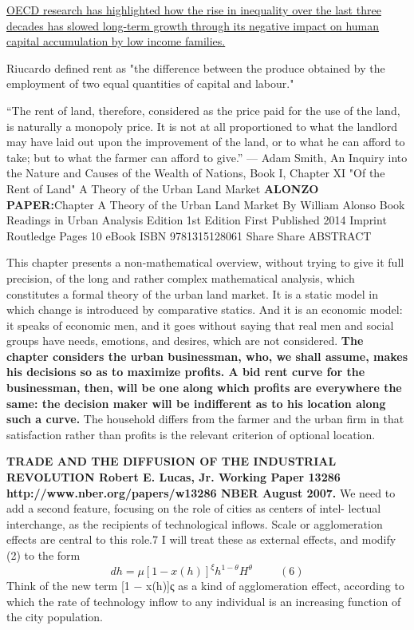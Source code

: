 \href{https://medium.com/@OECD/the-productivity-and-equality-nexus-is-there-a-benefit-in-addressing-them-together-60a46ab4fd09}{
OECD research has highlighted how the rise in inequality over the last three decades has slowed long-term growth through its negative impact on human capital accumulation by low income families.}


Riucardo  defined rent as "the difference between the produce obtained by the employment of two equal quantities of capital and labour."

``The rent of land, therefore, considered as the price paid for the use of the land, is naturally a monopoly price. It is not at all proportioned to what the landlord may have laid out upon the improvement of the land, or to what he can afford to take; but to what the farmer can afford to give.'' — Adam Smith, An Inquiry into the Nature and Causes of the Wealth of Nations, Book I, Chapter XI "Of the Rent of Land" A Theory of the Urban Land Market
\vspace{1cm}
\textbf{ALONZO PAPER:}Chapter
A Theory of the Urban Land Market
By William Alonso
Book
Readings in Urban Analysis
Edition 1st Edition
First Published 2014
Imprint Routledge
Pages 10
eBook ISBN 9781315128061
Share
Share
ABSTRACT

 This chapter presents a non-mathematical overview, without trying to give it full precision, of the long and rather complex mathematical analysis, which constitutes a formal theory of the urban land market. It is a static model in which change is introduced by comparative statics. And it is an economic model: it speaks of economic men, and it goes without saying that real men and social groups have needs, emotions, and desires, which are not considered. \textbf{The chapter considers the urban businessman, who, we shall assume, makes his decisions so as to maximize profits. A bid rent curve for the businessman, then, will be one along which profits are everywhere the same: the decision maker will be indifferent as to his location along such a curve.} The household differs from the farmer and the urban firm in that satisfaction rather than profits is the relevant criterion of optional location.

\vspace{1cm}
\textbf{TRADE AND THE DIFFUSION OF THE INDUSTRIAL REVOLUTION Robert E. Lucas, Jr.
Working Paper 13286 http://www.nber.org/papers/w13286
NBER August 2007.}
We need to add a second feature, focusing on the role of cities as centers of intel- lectual interchange, as the recipients of technological inflows. Scale or agglomeration effects are central to this role.7 I will treat these as external effects, and modify (2) to the form
\[dh =μ[1-x(h)]^\xi  h^{1-\theta}H^\theta \hspace{1cm} (6) \]
{\color{red}Think of the new term [1 − x(h)]ς as a kind of agglomeration effect, according to which the rate of technology inflow to any individual is an increasing function of the city population.} 

